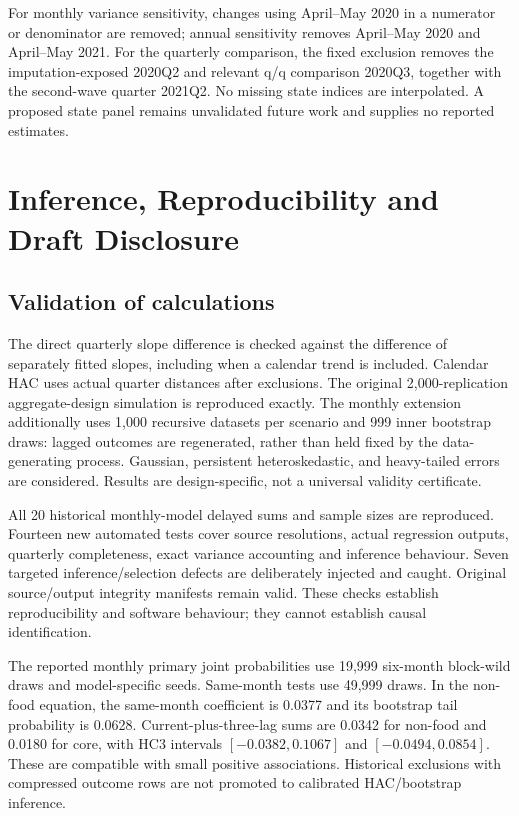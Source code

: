 \documentclass[11pt,a4paper]{article}
\begin{document}
For monthly variance sensitivity, changes using April--May 2020 in a numerator or denominator are removed; annual sensitivity removes April--May 2020 and April--May 2021. For the quarterly comparison, the fixed exclusion removes the imputation-exposed 2020Q2 and relevant q/q comparison 2020Q3, together with the second-wave quarter 2021Q2. No missing state indices are interpolated. A proposed state panel remains unvalidated future work and supplies no reported estimates.

\section{Inference, Reproducibility and Draft Disclosure}
\label{app:inference}



\subsection*{Validation of calculations}
The direct quarterly slope difference is checked against the difference of separately fitted slopes, including when a calendar trend is included. Calendar HAC uses actual quarter distances after exclusions. The original 2,000-replication aggregate-design simulation is reproduced exactly. The monthly extension additionally uses 1,000 recursive datasets per scenario and 999 inner bootstrap draws: lagged outcomes are regenerated, rather than held fixed by the data-generating process. Gaussian, persistent heteroskedastic, and heavy-tailed errors are considered. Results are design-specific, not a universal validity certificate.

All 20 historical monthly-model delayed sums and sample sizes are reproduced. Fourteen new automated tests cover source resolutions, actual regression outputs, quarterly completeness, exact variance accounting and inference behaviour. Seven targeted inference/selection defects are deliberately injected and caught. Original source/output integrity manifests remain valid. These checks establish reproducibility and software behaviour; they cannot establish causal identification.

The reported monthly primary joint probabilities use 19,999 six-month block-wild draws and model-specific seeds. Same-month tests use 49,999 draws. In the non-food equation, the same-month coefficient is 0.0377 and its bootstrap tail probability is 0.0628. Current-plus-three-lag sums are 0.0342 for non-food and 0.0180 for core, with HC3 intervals $[-0.0382,0.1067]$ and $[-0.0494,0.0854]$. These are compatible with small positive associations. Historical exclusions with compressed outcome rows are not promoted to calibrated HAC/bootstrap inference.
\end{document}
